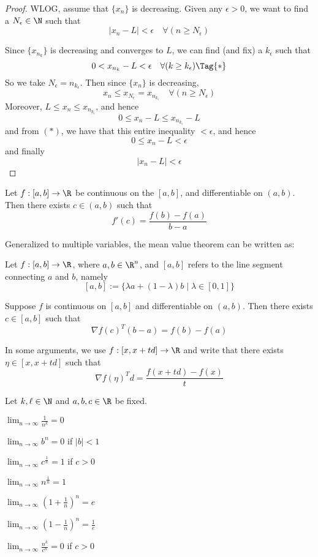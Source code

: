 \begin{proof}
  WLOG, assume that $\{x_n\}$ is decreasing.
  Given any $\epsilon>0$, we want to find a $N_\epsilon\in\N$ such that
  $$
    |x_n-L|<\epsilon\quad\forall(n\geq N_\epsilon)
  $$

  Since $\{x_{n_k}\}$ is decreasing and converges to $L$, we can find (and fix) a
  $k_\epsilon$ such that
  \begin{equation*}
    0<x_{n_k}-L<\epsilon\quad\forall(k\geq k_\epsilon)\Tag{*}
  \end{equation*}
  So we take $N_\epsilon=n_{k_\epsilon}$. Then since $\{x_n\}$ is
  decreasing,
  $$
    x_n\leq x_{N_\epsilon}=x_{n_{k_\epsilon}}\quad\forall(n\geq N_\epsilon)
  $$
  Moreover, $L\leq x_n\leq x_{n_{k_\epsilon}}$, and hence
  $$0\leq x_n-L\leq x_{n_{k_\epsilon}}-L$$
  and from $(*)$, we have that this entire inequality $<\epsilon$, and hence
  $$0\leq x_n-L<\epsilon$$
  and finally
  $$|x_n-L|<\epsilon$$
\end{proof}

\label{d37aa2b}

Let $f:[a,b]\to\R$ be continuous on the $[a,b]$, and differentiable on $(a,b)$.
Then there exists $c\in(a,b)$ such that
$$
  f'(c)=\frac{f(b)-f(a)}{b-a}
$$

Generalized to multiple variables, the mean value theorem can be written as:

Let $f:[a,b]\to\R$, where $a,b\in\R^n$, and $[a,b]$ refers to the line segment
connecting $a$ and $b$, namely
$$
  [a,b]:=\{\lambda a+(1-\lambda)b\mid\lambda\in[0,1]\}
$$

Suppose $f$ is continuous on $[a,b]$ and differentiable on $(a,b)$. Then there
exists $c\in[a,b]$ such that
$$
  \nabla f(c)^T(b-a)=f(b)-f(a)
$$

In some arguments, we use $f:[x,x+td]\to\R$ and write that there exists
$\eta\in[x,x+td]$ such that
$$
  \nabla f(\eta)^Td=\frac{f(x+td)-f(x)}t
$$

\label{ffc8953}

Let $k,\ell\in\N$ and $a,b,c\in\R$ be fixed.
\begin{enumerata}
  \def\li{\displaystyle\lim_{n\to\infty}}
  \item $\li\frac1{n^k}=0$
  \item $\li b^n=0$ \quad if \quad $|b|<1$
  \item $\li c^{\frac1n}=1$ \quad if \quad $c>0$
  \item $\li n^{\frac1n}=1$
  \item $\li \left(1+\frac1n\right)^n=e$
  \item $\li \left(1-\frac1n\right)^n=\frac1e$
  \item $\li \frac{n^k}{c^n}=0$ \quad if \quad $c>0$
\end{enumerata}

